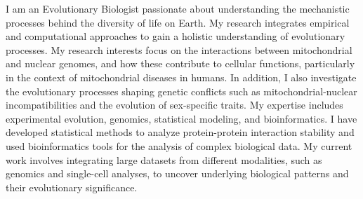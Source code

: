 
\begin{cvparagraph}
I am an Evolutionary Biologist passionate about understanding the mechanistic processes behind the diversity of life on Earth. My research integrates empirical and computational approaches to gain a holistic understanding of evolutionary processes. My research interests focus on the interactions between mitochondrial and nuclear genomes, and how these contribute to cellular functions, particularly in the context of mitochondrial diseases in humans. In addition, I also investigate the evolutionary processes shaping genetic conflicts such as mitochondrial-nuclear incompatibilities and the evolution of sex-specific traits. My expertise includes experimental evolution, genomics, statistical modeling, and bioinformatics. I have developed statistical methods to analyze protein-protein interaction stability and used bioinformatics tools for the analysis of complex biological data. My current work involves integrating large datasets from different modalities, such as genomics and single-cell analyses, to uncover underlying biological patterns and their evolutionary significance.
\end{cvparagraph}